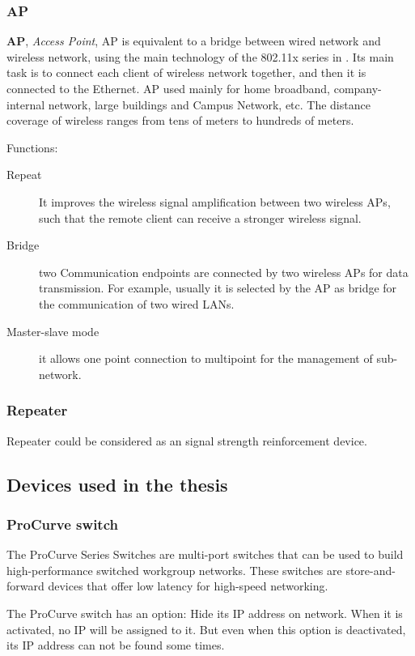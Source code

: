 \subsubsection{AP}

\textbf{AP}, \textit{Access Point}, AP is equivalent to a bridge between wired network and wireless network, using the main technology of the 802.11x series in \cite{rfc5416}\cite{Siddhartha2002} . Its main task is to connect each client of wireless network together, and then it is connected to the Ethernet. AP used mainly for home broadband, company-internal network, large buildings and Campus Network, etc. The distance coverage of wireless ranges from tens of meters to hundreds of meters.  

Functions: 

\begin{description}
	\item[Repeat] It improves the wireless signal amplification between two wireless APs, such that the remote client can receive a stronger wireless signal.  
	\item[Bridge] two Communication endpoints are connected by two wireless APs for data transmission. For example, usually it is selected by the AP as bridge for the communication of two wired LANs.  
	\item[Master-slave mode] it allows one point connection to multipoint for the management of sub-network.  
\end{description}

\subsubsection{Repeater}
Repeater could be considered as an signal strength reinforcement device.

\subsection{Devices used in the thesis}

\subsubsection{ProCurve switch}
The ProCurve Series Switches are multi-port switches that can be used to build high-performance switched workgroup networks. These switches are store-and-forward devices that offer low latency for high-speed networking.

The ProCurve switch has an option: Hide its IP address on network. When it is activated, no IP will be assigned to it. But even when this option is deactivated, its IP address can not be found some times.

